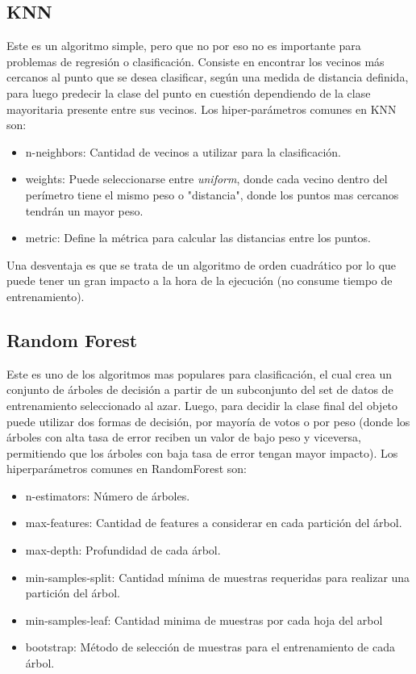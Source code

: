 \documentclass[12pt,a4paper]{article}
\begin{document}
\subsection{KNN}
Este es un algoritmo simple, pero que no por eso no es importante para problemas de regresión o clasificación. Consiste en encontrar los vecinos más cercanos al punto que se desea clasificar, según una medida de distancia definida, para luego predecir la clase del punto en cuestión dependiendo de la clase mayoritaria presente entre sus vecinos.
Los hiper-parámetros comunes en KNN son:
\begin{itemize}
    \item n-neighbors: Cantidad de vecinos a utilizar para la clasificación.
    
    \item weights: Puede seleccionarse entre \textit{uniform}, donde cada vecino dentro del perímetro tiene el mismo peso o "distancia", donde los puntos mas cercanos tendrán un mayor peso.
    
    \item metric: Define la métrica para calcular las distancias entre los puntos.
    
\end{itemize}

Una desventaja es que se trata de un algoritmo de orden cuadrático por lo que puede tener un gran impacto a la hora de la ejecución (no consume tiempo de entrenamiento).

\subsection{Random Forest}
Este es uno de los algoritmos mas populares para clasificación, el cual crea un conjunto de árboles de decisión a partir de un subconjunto del set de datos de entrenamiento seleccionado al azar. 
Luego, para decidir la clase final del objeto puede utilizar dos formas de decisión, por mayoría de votos o por peso (donde los árboles con alta tasa de error reciben un valor de bajo peso y viceversa, permitiendo que los árboles con baja tasa de error tengan mayor impacto).
Los hiperparámetros comunes en RandomForest son:

\begin{itemize}
    \item n-estimators: Número de árboles.
    
    \item max-features: Cantidad de features a considerar en cada partición del árbol.
    
    \item max-depth: Profundidad de cada árbol.
    
    \item min-samples-split: Cantidad mínima de muestras requeridas para realizar una partición del árbol.
    
    \item min-samples-leaf: Cantidad minima de muestras por cada hoja del arbol
    
    \item bootstrap: Método de selección de muestras para el entrenamiento de cada árbol.
    
\end{itemize}
\end{document}
